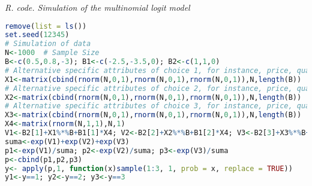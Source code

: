 \begin{tcolorbox}[enhanced,width=4.67in,center upper,
	fontupper=\large\bfseries,drop shadow southwest,sharp corners]
	\textit{R. code. Simulation of the multinomial logit model}
	\begin{VF}
		\begin{lstlisting}[language=R]		
remove(list = ls())
set.seed(12345)
# Simulation of data
N<-1000  # Sample Size
B<-c(0.5,0.8,-3); B1<-c(-2.5,-3.5,0); B2<-c(1,1,0)
# Alternative specific attributes of choice 1, for instance, price, quality and duration of choice 1
X1<-matrix(cbind(rnorm(N,0,1),rnorm(N,0,1),rnorm(N,0,1)),N,length(B)) 
# Alternative specific attributes of choice 2, for instance, price, quality and duration of choice 2
X2<-matrix(cbind(rnorm(N,0,1),rnorm(N,0,1),rnorm(N,0,1)),N,length(B))
# Alternative specific attributes of choice 3, for instance, price, quality and duration of choice 3
X3<-matrix(cbind(rnorm(N,0,1),rnorm(N,0,1),rnorm(N,0,1)),N,length(B))
X4<-matrix(rnorm(N,1,1),N,1)
V1<-B2[1]+X1%*%B+B1[1]*X4; V2<-B2[2]+X2%*%B+B1[2]*X4; V3<-B2[3]+X3%*%B+B1[3]*X4
suma<-exp(V1)+exp(V2)+exp(V3)
p1<-exp(V1)/suma; p2<-exp(V2)/suma; p3<-exp(V3)/suma
p<-cbind(p1,p2,p3)
y<- apply(p,1, function(x)sample(1:3, 1, prob = x, replace = TRUE))
y1<-y==1; y2<-y==2; y3<-y==3
\end{lstlisting}
	\end{VF}
\end{tcolorbox} 

